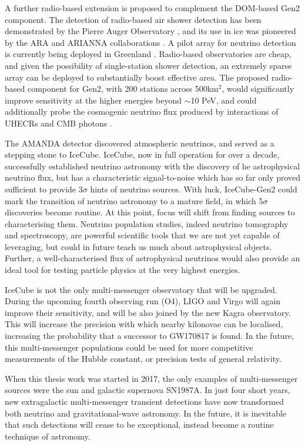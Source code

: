 A further radio-based extension is proposed to complement the DOM-based Gen2 component. The detection of radio-based air shower detection has been demonstrated by the Pierre Auger Observatory , and its use in ice was pioneered by the ARA and ARIANNA collaborations . A pilot array for neutrino detection is currently being deployed in Greenland . Radio-based observatories are cheap, and given the possibility of single-station shower detection, an extremely sparse array can be deployed to substantially boost effective area. The proposed radio-based component for Gen2, with 200 stations across 500km$^{2}$, would significantly improve sensitivity at the higher energies beyond $\sim$10 PeV, and could additionally probe the cosmogenic neutrino flux produced by interactions of UHECRs and CMB photons \cite{ic_gen2_21}.

The AMANDA detector discovered atmospheric neutrinos, and served as a stepping stone to IceCube. IceCube, now in full operation for over a decade, successfully established neutrino astronomy with the discovery of he astrophysical neutrino flux, but has a characteristic signal-to-noise which has so far only proved sufficient to provide 3$\sigma$ hints of neutrino sources. With luck, IceCube-Gen2 could mark the transition of neutrino astronomy to a mature field, in which 5$\sigma$ discoveries become routine. At this point, focus will shift from finding sources to characterising them. Neutrino population studies, indeed neutrino tomography and spectroscopy, are powerful scientific tools that we are not yet capable of leveraging, but could in future teach us much about astrophysical objects. Further, a well-characterised flux of astrophysical neutrinos would also provide an ideal tool for testing particle physics at the very highest energies.

IceCube is not the only multi-messenger observatory that will be upgraded. During the upcoming fourth observing run (O4), LIGO and Virgo will again improve their sensitivity, and will be also joined by the new Kagra observatory. This will increase the precision with which nearby kilonovae can be localised, increasing the probability that a successor to GW170817 is found. In the future, this multi-messenger populations could be used for more competitive measurements of the Hubble constant, or precision tests of general relativity. 

When this thesis work was started in 2017, the only examples of multi-messenger sources were the sun and galactic supernova SN1987A. In just four short years, new extragalactic multi-messenger transient detections have now transformed both neutrino and gravitational-wave astronomy. In the future, it is inevitable that such detections will cease to be exceptional, instead become a routine technique of astronomy. 
